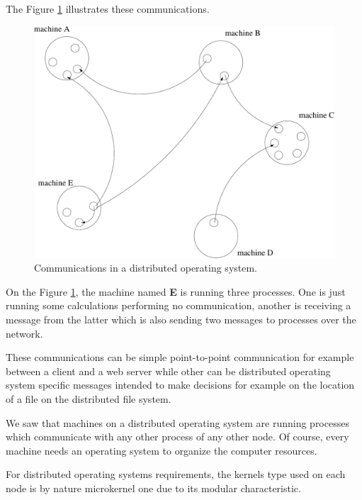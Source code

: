 The Figure \ref{figure:overview_distributed-operating-system} illustrates
these communications.

\begin{figure}[h]
  \begin{center}
    \includegraphics[scale=0.5]{figures/overview_distributed-operating-system.pdf}
    \caption{Communications in a distributed operating system.}
    \label{figure:overview_distributed-operating-system}
  \end{center}
\end{figure}

On the Figure \ref{figure:overview_distributed-operating-system}, the machine
named \textbf{E} is running three processes. One is just running some
calculations performing no communication, another is receiving a message
from the latter which is also sending two messages to processes over the
network.

These communications can be simple point-to-point communication for example
between a client and a web server while other can be distributed operating
system specific messages intended to make decisions for example on the
location of a file on the distributed file system.

We saw that machines on a distributed operating system are running processes
which communicate with any other process of any other node. Of course,
every machine needs an operating system to organize the computer resources.

For distributed operating systems requirements, the kernels type used on
each node is by nature microkernel one due to its modular characteristic.

